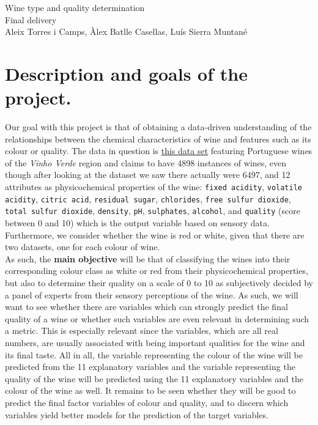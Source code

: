 \documentclass[10pt]{article}
\begin{document}
\begingroup
  \centering
  \Huge Wine type and quality determination \\
  \vskip 0.35cm
  \LARGE Final delivery\\
  \vskip 0.25cm
  \large Aleix Torres i Camps, Àlex Batlle Casellas, Luís Sierra Muntané\\[1.5em]
\endgroup


\section{Description and goals of the project.}
Our goal with this project is that of obtaining a data-driven understanding of the relationships between the chemical characteristics of wine and features such as its colour or quality. The data in question is \href{http://archive.ics.uci.edu/ml/datasets/Wine+Quality}{this data set} featuring Portuguese wines of the \textit{Vinho Verde} region and claims to have 4898 instances of wines, even though after looking at the dataset we saw there actually were 6497, and 12 attributes as physicochemical properties of the wine: \verb|fixed acidity|, \verb|volatile acidity|, \verb|citric acid|, \verb|residual sugar|, \verb|chlorides|, \verb|free sulfur dioxide|, \verb|total sulfur dioxide|, \verb|density|, \verb|pH|, \verb|sulphates|, \verb|alcohol|, and \verb|quality| (score between 0 and 10) which is the output variable based on sensory data.
Furthermore, we consider whether the wine is red or white, given that there are two datasets, one for each colour of wine. \\

As such, the \textbf{main objective} will be that of classifying the wines into their corresponding colour class as white or red from their physicochemical properties, but also to determine their quality on a scale of 0 to 10 as subjectively decided by a panel of experts from their sensory perceptions of the wine. As such, we will want to see whether there are variables which can strongly predict the final quality of a wine or whether such variables are even relevant in determining such a metric. This is especially relevant since the variables, which are all real numbers, are usually associated with being important qualities for the wine and its final taste. All in all, the variable representing the colour of the wine will be predicted from the 11 explanatory variables and the variable representing the quality of the wine will be predicted using the 11 explanatory variables and the colour of the wine as well. It remains to be seen whether they will be good to predict the final factor variables of colour and quality, and to discern which variables yield better models for the prediction of the target variables.
\end{document}
